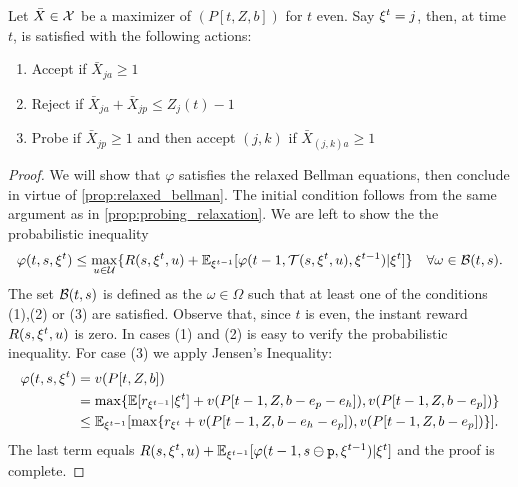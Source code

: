 \begin{lemma}
Let $\bar X\in\mathcal{X}$ be a maximizer of $(P[t,Z,b])$ for $t$ even.
Say $\xi^t=j$, then, at time $t$, \off is satisfied with the following actions:
\begin{enumerate}
\item Accept if $\bar X_{ja}\geq 1$
\item Reject if $\bar X_{ja}+\bar X_{jp}\leq Z_j(t)-1$
\item Probe if $\bar X_{jp}\geq 1$ and then accept $(j,k)$ if $\bar X_{(j,k)a}\geq 1$
\end{enumerate}
\end{lemma}
\begin{proof}
We will show that $\varphi$ satisfies the relaxed Bellman equations, then conclude in virtue of \cref{prop:relaxed_bellman}.
The initial condition follows from the same argument as in \cref{prop:probing_relaxation}.
We are left to show the the probabilistic inequality
\[
\varphi(t,s,\xi^t) \leq \max_{u\in\mathcal{U}}\{R(s,\xi^t,u)+\mathbb{E}_{\xi^{t-1}}[\varphi(t-1,\mathcal{T}(s,\xi^t,u),\xi^{t-1})|\xi^t]\} \quad \forall \omega\in\mathcal{B}(t,s).
\]
The set $\mathcal{B}(t,s)$ is defined as the $\omega\in\Omega$ such that at least one of the conditions (1),(2) or (3) are satisfied.
Observe that, since $t$ is even, the instant reward $R(s,\xi^t,u)$ is zero.
In cases (1) and (2) is easy to verify the probabilistic inequality.
For case (3) we apply Jensen's Inequality:
\begin{align*}
\varphi(t,s,\xi^t) &= v(P[t,Z,b]) \\
&= \max\{\mathbb{E}[r_{\xi^{t-1}}|\xi^t]+v(P[t-1,Z,b-e_p-e_h]),v(P[t-1,Z,b-e_p])\} \\
&\leq \mathbb{E}_{\xi^{t-1}}[\max\{r_{\xi^t}+v(P[t-1,Z,b-e_h-e_p]),v(P[t-1,Z,b-e_p])\}].
\end{align*}
The last term equals $R(s,\xi^t,u)+\mathbb{E}_{\xi^{t-1}}[\varphi(t-1,s\ominus\texttt{p},\xi^{t-1})|\xi^t]$ and the proof is complete.
\end{proof}